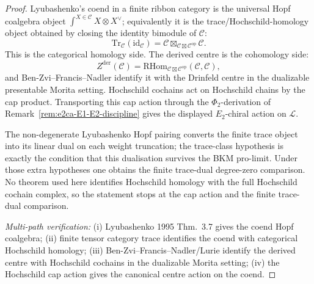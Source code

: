 \begin{proof}
Lyubashenko's coend in a finite ribbon category is the universal
Hopf coalgebra object
$\int^{X\in\mathcal C}X\otimes X^\vee$; equivalently it is the
trace/Hochschild-homology object obtained by closing the identity
bimodule of $\mathcal C$:
\[
 \mathrm{Tr}_{\mathcal C}(\mathrm{id}_{\mathcal C})
 =
 \mathcal C\boxtimes_{\mathcal C\boxtimes\mathcal C^{\mathrm{op}}}
 \mathcal C.
\]
This is the categorical homology side. The derived centre is the
cohomology side:
\[
 Z^{\mathrm{der}}(\mathcal C)
 =
 \mathrm{RHom}_{\mathcal C\boxtimes\mathcal C^{\mathrm{op}}}
 (\mathcal C,\mathcal C),
\]
and Ben-Zvi--Francis--Nadler identify it with the Drinfeld centre in
the dualizable presentable Morita setting. Hochschild cochains act on
Hochschild chains by the cap product. Transporting this cap action
through the $\Phi_2$-derivation of
Remark~\ref{rem:e2ca-E1-E2-discipline} gives the displayed
$E_2$-chiral action on $\mathcal L$.

The non-degenerate Lyubashenko Hopf pairing converts the finite
trace object into its linear dual on each weight truncation; the
trace-class hypothesis is exactly the condition that this dualisation
survives the BKM pro-limit. Under those extra hypotheses one obtains
the finite trace-dual degree-zero comparison. No theorem used here
identifies Hochschild homology with the full Hochschild cochain
complex, so the statement stops at the cap action and the finite
trace-dual comparison.

\emph{Multi-path verification:}
(i) Lyubashenko 1995 Thm.~3.7 gives the coend Hopf coalgebra;
(ii) finite tensor category trace identifies the coend with categorical
 Hochschild homology;
(iii) Ben-Zvi--Francis--Nadler/Lurie identify the derived centre with
 Hochschild cochains in the dualizable Morita setting;
(iv) the Hochschild cap action gives the canonical centre action on
 the coend.
\end{proof}

